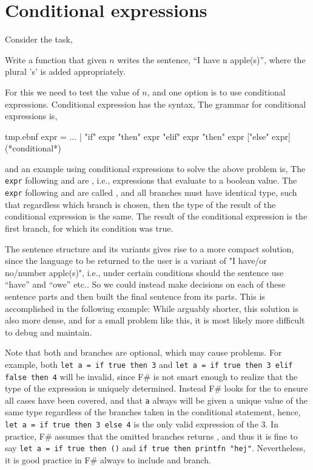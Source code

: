 \section{Conditional expressions}
Consider the task,
\begin{problem}
  Write a function that given $n$ writes the sentence, ``I have n apple(s)'', where the plural 's' is added appropriately.
\end{problem}
For this we need to test the value of $n$, and one option is to use conditional expressions. Conditional expression has the syntax,
%
The grammar for conditional expressions is,
\begin{verbatimwrite}{tmp.ebnf}
expr = ... 
  | "if" expr "then" expr {"elif" expr "then" expr} ["else" expr] (*conditional*)
\end{verbatimwrite}
%
and an example using conditional expressions to solve the above problem is,
%
%
The \lstinline[language=ebnf]!expr! following  and  are , i.e., expressions that evaluate to a boolean value. The \lstinline[language=ebnf]!expr! following  and  are called , and all branches must have identical type, such that regardless which branch is chosen, then the type of the result of the conditional expression is the same. The result of the conditional expression is the first branch, for which its condition was true. 

The sentence structure and its variants gives rise to a more compact solution, since the language to be returned to the user is a variant of "I have/or no/number apple(s)", i.e., under certain conditions should the sentence use ``have'' and ``owe'' etc.. So we could instead make decisions on each of these sentence parts and then built the final sentence from its parts. This is accomplished in the following example:
%
%
While arguably shorter, this solution is also more dense, and for a small problem like this, it is most likely more difficult to debug and maintain.

Note that both  and  branches are optional, which may cause problems. For example, both \mbox{\lstinline!let a = if true then 3!} and \mbox{\lstinline!let a = if true then 3 elif false then 4!}  will be invalid, since F\# is not smart enough to realize that the type of the expression is uniquely determined. Instead F\# looks for the  to ensure all cases have been covered, and that \lstinline!a! always will be given a unique value of the same type regardless of the branches taken in the conditional statement, hence, \mbox{\lstinline!let a = if true then 3 else 4!}  is the only valid expression of the 3. In practice, F\# assumes that the omitted branches returns \lexeme{()}, and thus it is fine to say \mbox{\lstinline!let a = if true then ()!} and \mbox{\lstinline!if true then printfn "hej"!}. Nevertheless, it is good practice in F\# always to include and  branch.


